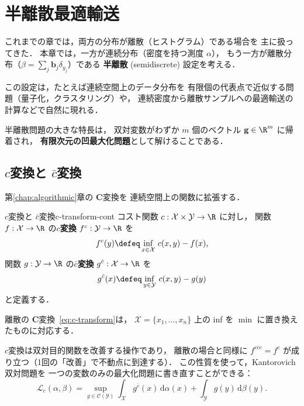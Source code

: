 
\chapter{半離散最適輸送}\label{chap:semidiscrete}

これまでの章では，両方の分布が離散（ヒストグラム）である場合を
主に扱ってきた．
本章では，一方が連続分布（密度を持つ測度 $\alpha$），
もう一方が離散分布（$\beta = \sum_j \mathbf{b}_j \delta_{y_j}$）である
\textbf{半離散} (semidiscrete) 設定を考える．

この設定は，たとえば連続空間上のデータ分布を
有限個の代表点で近似する問題（量子化，クラスタリング）や，
連続密度から離散サンプルへの最適輸送の計算などで自然に現れる．

半離散問題の大きな特長は，
双対変数がわずか $m$ 個のベクトル $\mathbf{g} \in \R^m$ に帰着され，
\textbf{有限次元の凹最大化問題}として解けることである．


\section{$c$変換と $\bar{c}$変換}\label{sec:c-transform-cont}

第\ref{chap:algorithmic}章の $\mathbf{C}$変換を
連続空間上の関数に拡張する．

\begin{definition}{$c$変換と $\bar{c}$変換}{c-transform-cont}
コスト関数 $c : \mathcal{X} \times \mathcal{Y} \to \R$ に対し，
関数 $f : \mathcal{X} \to \R$ の\textbf{$c$変換}
$f^c : \mathcal{Y} \to \R$ を
\begin{equation}\label{eq:c-transform-cont}
  f^c(y) \defeq \inf_{x \in \mathcal{X}}\, c(x, y) - f(x),
\end{equation}
関数 $g : \mathcal{Y} \to \R$ の\textbf{$\bar{c}$変換}
$g^{\bar{c}} : \mathcal{X} \to \R$ を
\begin{equation}\label{eq:cbar-transform-cont}
  g^{\bar{c}}(x) \defeq \inf_{y \in \mathcal{Y}}\, c(x, y) - g(y)
\end{equation}
と定義する．
\end{definition}

離散の $\mathbf{C}$変換~\eqref{eq:c-transform}は，
$\mathcal{X} = \{x_1, \ldots, x_n\}$ 上の inf を
$\min$ に置き換えたものに対応する．

$c$変換は双対目的関数を改善する操作であり，
離散の場合と同様に
$f^{c\bar{c}c} = f^c$ が成り立つ（1回の「改善」で不動点に到達する）．
この性質を使って，Kantorovich 双対問題を
一つの変数のみの最大化問題に書き直すことができる：
\begin{equation}\label{eq:dual-single}
  \mathcal{L}_c(\alpha, \beta)
  = \sup_{g \in \mathcal{C}(\mathcal{Y})}
  \int_{\mathcal{X}} g^{\bar{c}}(x)\, \mathrm{d}\alpha(x)
  + \int_{\mathcal{Y}} g(y)\, \mathrm{d}\beta(y).
\end{equation}

